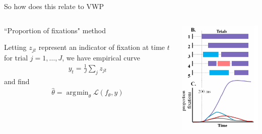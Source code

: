 \documentclass{beamer}
\DeclareMathOperator*{\argmin}{arg\!\min}
\newcommand{\vp}{\vspace{2mm}}
\begin{document}
\begin{frame}{So how does this relate to VWP}

\begin{columns}
\begin{column}{0.45\textwidth}

``Proportion of fixations" method \vp

Letting $z_{jt}$ represent an indicator of fixation at time $t$ for trial $j = 1, \dots, J$, we have empirical curve
\begin{align*}
y_{t} = \frac1J \sum_j z_{jt}
\end{align*}
and find
\begin{align*}
\hat{\theta} = \argmin_{\theta} \mathcal{L}(f_{\theta}, y)
\end{align*}

\end{column}
\begin{column}{0.5\textwidth}  %
\begin{center}
\includegraphics[scale=0.5]{img/bob_aggregate.png}
\end{center}
\end{column}
\end{columns}
\end{frame}
\end{document}
